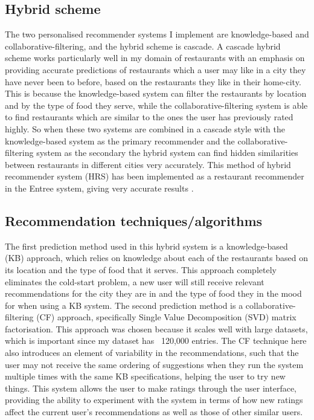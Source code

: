 \documentclass[conference]{IEEEtran}
\begin{document}
\subsection{Hybrid scheme}
The two personalised recommender systems I implement are knowledge-based and collaborative-filtering, and 
the hybrid scheme is cascade. 
A cascade hybrid scheme works particularly well in my domain of restaurants with an emphasis on providing accurate 
predictions of restaurants which a user may like in a city they have never been to before, based on the restaurants 
they like in their home-city. 
This is because the knowledge-based system can filter the restaurants by location and by the type of food they serve, 
while the collaborative-filtering system is able to find restaurants which are similar to the ones the user has 
previously rated highly. 
So when these two systems are combined in a cascade style with the knowledge-based system as the primary recommender 
and the collaborative-filtering system as the secondary the hybrid system can find hidden similarities between 
restaurants in different cities very accurately. 
This method of hybrid recommender system (HRS) has been implemented as a restaurant recommender in the Entree 
system, giving very accurate results \cite{burke1999integrating,burke2000knowledge,burke2002hybrid,burke2007hybrid}. 

\subsection{Recommendation techniques/algorithms}
The first prediction method used in this hybrid system is a knowledge-based (KB) approach, which relies on knowledge 
about each of the restaurants based on its location and the type of food that it serves. 
This approach completely eliminates the cold-start problem, a new user will still receive relevant recommendations 
for the city they are in and the type of food they in the mood for when using a KB system. 
The second prediction method is a collaborative-filtering (CF) approach, specifically Single Value Decomposition (SVD) 
matrix factorisation. 
This approach was chosen because it scales well with large datasets, which is important since my dataset has 
~120,000 entries. 
The CF technique here also introduces an element of variability in the recommendations, such that the user 
may not receive the same ordering of suggestions when they run the system multiple times with the same 
KB specifications, helping the user to try new things. 
This system allows the user to make ratings through the user interface, providing the ability to experiment with 
the system in terms of how new ratings affect the current user's recommendations as well as those of other similar users. 
\end{document}

